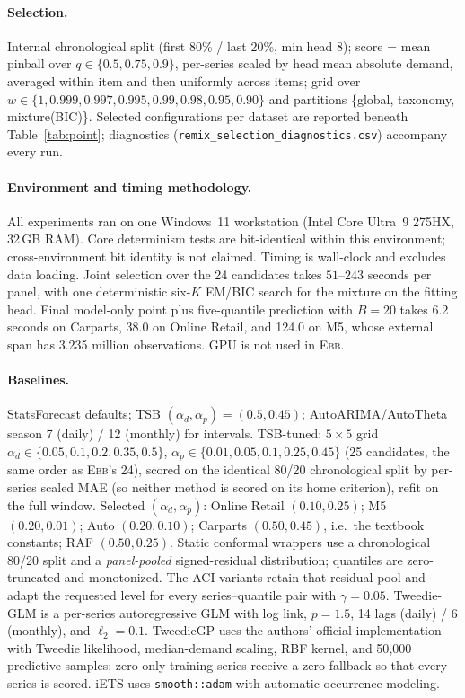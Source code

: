 \documentclass[twocolumn,10pt]{article}
\theoremstyle{definition}
\newcommand{\EBB}{\textsc{Ebb}}
\begin{document}
\paragraph{Selection.} Internal chronological split (first 80\% / last
20\%, min head 8); score = mean pinball over $q\in\{0.5,0.75,0.9\}$,
per-series scaled by head mean absolute demand, averaged within item and then
uniformly across items; grid over
$w\in\{1,0.999,0.997,0.995,0.99,0.98,0.95,0.90\}$ and partitions
\{global, taxonomy, mixture(BIC)\}. Selected configurations per dataset
are reported beneath Table~\ref{tab:point}; diagnostics
(\texttt{remix\_selection\_diagnostics.csv}) accompany every run.

\paragraph{Environment and timing methodology.} All experiments ran on one
Windows~11 workstation (Intel Core Ultra~9 275HX, 32\,GB RAM). Core
determinism tests are bit-identical within this environment;
cross-environment bit identity is not claimed. Timing is wall-clock and
excludes data loading. Joint selection over the 24 candidates takes
$51$--$243$ seconds per panel, with one deterministic six-$K$ EM/BIC
search for the mixture on the fitting head. Final model-only point plus
five-quantile prediction with $B=20$ takes 6.2 seconds on
Carparts, 38.0 on Online Retail, and 124.0 on M5, whose
external span has 3.235 million observations. GPU is not used in \EBB{}.

\paragraph{Baselines.} StatsForecast defaults; TSB
$(\alpha_d,\alpha_p)=(0.5,0.45)$; AutoARIMA/AutoTheta season 7 (daily) /
12 (monthly) for intervals. TSB-tuned: $5\times5$ grid
$\alpha_d\in\{0.05,0.1,0.2,0.35,0.5\}$,
$\alpha_p\in\{0.01,0.05,0.1,0.25,0.45\}$ (25 candidates, the same order
as \EBB{}'s 24), scored on the identical 80/20 chronological split by
per-series scaled MAE (so neither method is scored on its home
criterion), refit on the full window. Selected $(\alpha_d,\alpha_p)$:
Online Retail $(0.10,0.25)$; M5 $(0.20,0.01)$; Auto $(0.20,0.10)$;
Carparts $(0.50,0.45)$, i.e.\ the textbook constants; RAF
$(0.50,0.25)$. Static conformal wrappers use a chronological 80/20 split
and a \emph{panel-pooled} signed-residual distribution; quantiles are
zero-truncated and monotonized. The ACI variants retain that residual
pool and adapt the requested level for every series--quantile pair with
$\gamma=0.05$. Tweedie-GLM is a per-series autoregressive GLM with log
link, $p{=}1.5$, 14 lags (daily) / 6 (monthly), and $\ell_2{=}0.1$.
TweedieGP uses the authors' official implementation with Tweedie
likelihood, median-demand scaling, RBF kernel, and 50{,}000 predictive
samples; zero-only training series receive a zero fallback so that every
series is scored. iETS uses \texttt{smooth::adam} with automatic
occurrence modeling.
\end{document}
